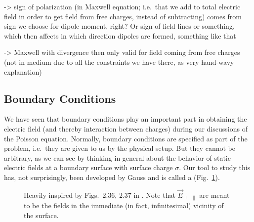 \documentclass[../class_mech_main.tex]{subfiles}
\begin{document}
-> sign of polarization (in Maxwell equation; i.e.~that we add to total electric field in order to get field from free charges, instead of subtracting) comes from sign we choose for dipole moment, right? Or sign of field lines or something, which then affects in which direction dipoles are formed, something like that

-> Maxwell with divergence then only valid for field coming from free charges (not in medium due to all the constraints we have there, as very hand-wavy explanation)



        \subsection{Boundary Conditions}
We have seen that boundary conditions play an important part in obtaining the electric field (and thereby interaction between charges) during our discussions of the Poisson equation. Normally, boundary conditions are specified as part of the problem, i.e.~they are given to us by the physical setup. But they cannot be arbitrary, as we can see by thinking in general about the behavior of static electric fields at a boundary surface with surface charge $\sigma$. Our tool to study this has, not surprisingly, been developed by Gauss and is called a  (Fig.~\ref{fig:gaussian_pillow}).



\begin{figure}
    \centering

    \hspace*{0.1\textwidth}%

    \caption{Heavily inspired by Figs.~2.36, 2.37 in \cite{Griffiths_2017}. Note that $\vec{E}_{\perp, \parallel}$ are meant to be the fields in the immediate (in fact, infinitesimal) vicinity of the surface.}
    \label{fig:gaussian_pillow}
\end{figure}
\end{document}
